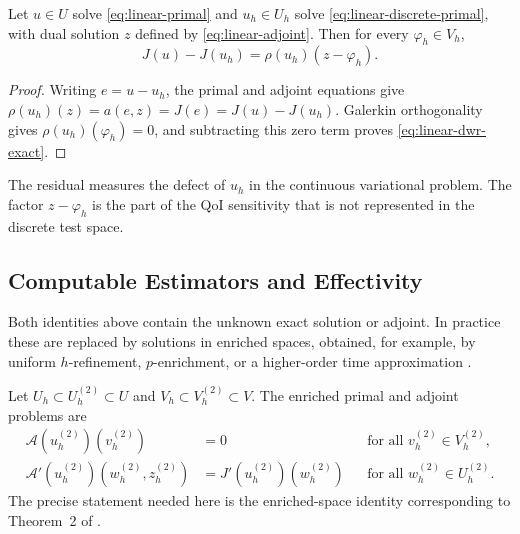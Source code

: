 \begin{proposition}
\label{prop:linear-dwr}
Let \(u\in U\) solve \eqref{eq:linear-primal} and \(u_h\in U_h\) solve \eqref{eq:linear-discrete-primal}, with dual solution \(z\) defined by \eqref{eq:linear-adjoint}. Then for every \(\varphi_h\in V_h\),
\begin{equation}
  J(u)-J(u_h)
  =
  \rho(u_h)(z-\varphi_h).
  \label{eq:linear-dwr-exact}
\end{equation}
\end{proposition}
\begin{proof}
Writing \(e=u-u_h\), the primal and adjoint equations give \(\rho(u_h)(z)=a(e,z)=J(e)=J(u)-J(u_h)\). Galerkin orthogonality gives \(\rho(u_h)(\varphi_h)=0\), and subtracting this zero term proves \eqref{eq:linear-dwr-exact}.
\end{proof}
The residual measures the defect of \(u_h\) in the continuous variational problem. The factor \(z-\varphi_h\) is the part of the QoI sensitivity that is not represented in the discrete test space.


\subsection{Computable Estimators and Effectivity}
\label{sec:background-effectivity}

Both identities above contain the unknown exact solution or adjoint. In practice these are replaced by solutions in enriched spaces, obtained, for example, by uniform \(h\)-refinement, \(p\)-enrichment, or a higher-order time approximation \cite{Becker_Rannacher_2001,ENDTMAYER202419}.

Let \(U_h\subset U_h^{(2)}\subset U\) and \(V_h\subset V_h^{(2)}\subset V\). The enriched primal and adjoint problems are
\begin{align}
  \mathcal{A}(u_h^{(2)})(v_h^{(2)})&=0
  &&\text{for all }v_h^{(2)}\in V_h^{(2)},\label{eq:enriched-primal}\\
  \mathcal{A}'(u_h^{(2)})(w_h^{(2)},z_h^{(2)})
  &=J'(u_h^{(2)})(w_h^{(2)})
  &&\text{for all }w_h^{(2)}\in U_h^{(2)}.\label{eq:enriched-adjoint}
\end{align}
The precise statement needed here is the enriched-space identity corresponding to Theorem~2 of \cite{ENDTMAYER202419}.

